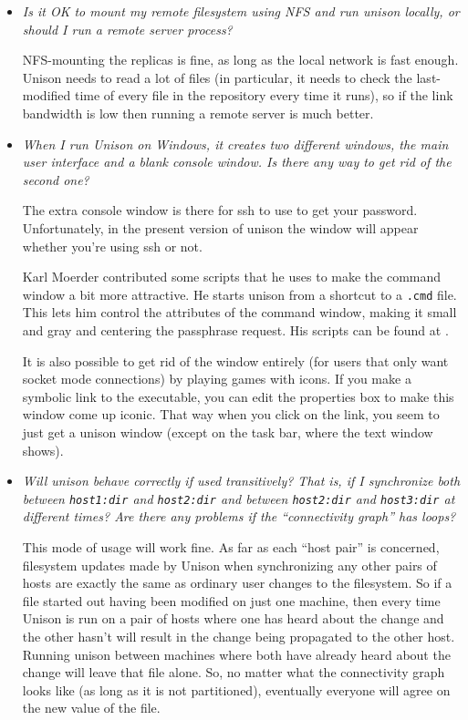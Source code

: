 \begin{itemize}
\item {\em Is it OK to mount my remote filesystem using NFS and
  run unison locally, or should I run a remote server process?}

NFS-mounting the replicas is fine, as long as the local network is
fast enough.  Unison needs to read a lot of files (in particular, it
needs to check the last-modified time of every file in the repository
every time it runs), so if the link bandwidth is low then running a
remote server is much better.

\item {\em When I run Unison on Windows, it creates two different
  windows, the main user interface and a blank console window.  Is
  there any way to get rid of the second one?}

The extra console window is there for ssh to use to get your password.
Unfortunately, in the present version of unison the window will appear
whether you're using ssh or not.

Karl Moerder contributed some scripts that he uses to make the command
window a bit more attractive.  He starts unison from a shortcut to a
\verb|.cmd| file. This lets him control the attributes of the command
window, making it small and gray and centering the passphrase request.
His scripts can be found at 
.

It is also possible to get rid of the window entirely (for users that
only want socket mode connections) by playing games with icons.  
If you make a symbolic link to the executable, you can edit the
properties box to make this window come up iconic.  That way when you
click on the link, you seem to just get a unison window (except on the
task bar, where the text window shows).  

\item {\em Will unison behave correctly if used transitively?  That is,
  if I synchronize both between \verb|host1:dir| and \verb|host2:dir| and
  between \verb|host2:dir| and \verb|host3:dir| at different times?  Are
  there any problems if the ``connectivity graph'' has loops?}

This mode of usage will work fine.  As far as each ``host pair'' is
concerned, filesystem updates made by Unison when synchronizing any other
pairs of hosts are exactly the same as ordinary user changes to the
filesystem.  So if a file started out having been modified on just one
machine, then every time Unison is run on a pair of hosts where one has
heard about the change and the other hasn't will result in the change
being propagated to the other host.  Running unison between machines
where both have already heard about the change will leave that file
alone.  So, no matter what the connectivity graph looks like (as long as
it is not partitioned), eventually everyone will agree on the new value
of the file.


\end{itemize}
